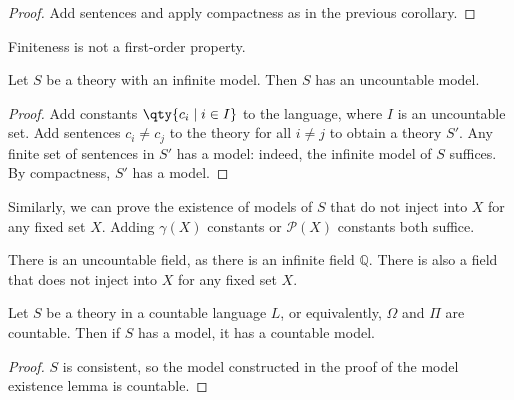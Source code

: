 \begin{proof}
    Add sentences and apply compactness as in the previous corollary.
\end{proof}
Finiteness is not a first-order property.
\begin{theorem}
    Let $S$ be a theory with an infinite model.
    Then $S$ has an uncountable model.
\end{theorem}
\begin{proof}
    Add constants $\qty{c_i \mid i \in I}$ to the language, where $I$ is an uncountable set.
    Add sentences $c_i \neq c_j$ to the theory for all $i \neq j$ to obtain a theory $S'$.
    Any finite set of sentences in $S'$ has a model: indeed, the infinite model of $S$ suffices.
    By compactness, $S'$ has a model.
\end{proof}
\begin{remark}
    Similarly, we can prove the existence of models of $S$ that do not inject into $X$ for any fixed set $X$.
    Adding $\gamma(X)$ constants or $\mathcal P(X)$ constants both suffice.
\end{remark}
\begin{example}
    There is an uncountable field, as there is an infinite field $\mathbb Q$.
    There is also a field that does not inject into $X$ for any fixed set $X$.
\end{example}
\begin{theorem}
    Let $S$ be a theory in a countable language $L$, or equivalently, $\Omega$ and $\Pi$ are countable.
    Then if $S$ has a model, it has a countable model.
\end{theorem}
\begin{proof}
    $S$ is consistent, so the model constructed in the proof of the model existence lemma is countable.
\end{proof}

